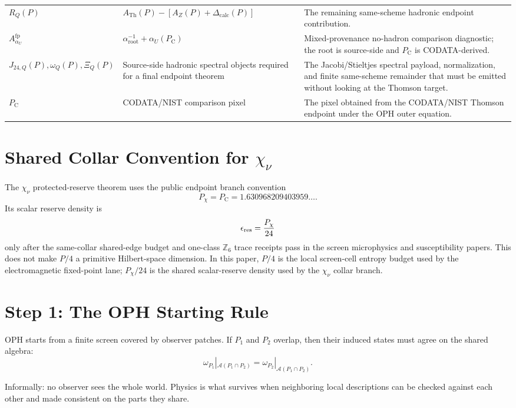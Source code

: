\documentclass[11pt]{article}
\theoremstyle{remark}
\newcommand{\A}{\mathcal A}
\newcommand{\ATh}{A_{\mathrm{Th}}}
\newcommand{\AZ}{A_Z}
\newcommand{\Ppub}{P_{\mathrm C}}
\newcommand{\Rq}{R_Q}
\newcommand{\Dcalc}{\Delta_{\mathrm{calc}}}
\begin{document}
\begin{longtable}{@{}L{0.20\textwidth}L{0.32\textwidth}L{0.38\textwidth}@{}}
\(\Rq(P)\) & \(\ATh(P)-[\AZ(P)+\Dcalc(P)]\) & The remaining same-scheme hadronic endpoint contribution. \\
\(A_{\alpha_U}^{\mathrm{fp}}\) & \(\alpha_{\mathrm{root}}^{-1}+\alpha_U(\Ppub)\) & Mixed-provenance no-hadron comparison diagnostic; the root is source-side and \(\Ppub\) is CODATA-derived. \\
\(J_{24,Q}(P),\omega_Q(P),\Xi_Q(P)\) & Source-side hadronic spectral objects required for a final endpoint theorem & The Jacobi/Stieltjes spectral payload, normalization, and finite same-scheme remainder that must be emitted without looking at the Thomson target. \\
\(\Ppub\) & CODATA/NIST comparison pixel & The pixel obtained from the CODATA/NIST Thomson endpoint under the OPH outer equation. \\
\bottomrule
\end{longtable}

\section{Shared Collar Convention for \(\chi_\nu\)}

The \(\chi_\nu\) protected-reserve theorem uses the public endpoint branch
convention
\[
P_\chi=P_{\mathrm C}=1.630968209403959\ldots .
\]
Its scalar reserve density is
\[
\epsilon_{\rm res}=\frac{P_\chi}{24}
\]
only after the same-collar shared-edge budget and one-class \(\mathbb Z_6\)
trace receipts pass in the screen microphysics and susceptibility papers.  This
does not make \(P/4\) a primitive Hilbert-space dimension.  In this paper,
\(P/4\) is the local screen-cell entropy budget used by the electromagnetic
fixed-point lane; \(P_\chi/24\) is the shared scalar-reserve density used by the
\(\chi_\nu\) collar branch.

\section{Step 1: The OPH Starting Rule}

OPH starts from a finite screen covered by observer patches. If \(P_1\) and \(P_2\) overlap, then their induced states must agree on the shared algebra:
\begin{equation}
\omega_{P_1}|_{\A(P_1\cap P_2)}
=
\omega_{P_2}|_{\A(P_1\cap P_2)}.
\label{eq:overlap}
\end{equation}

Informally: no observer sees the whole world. Physics is what survives when neighboring local descriptions can be checked against each other and made consistent on the parts they share.
\end{document}

